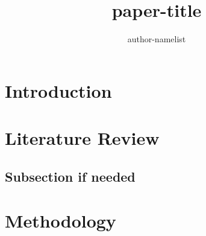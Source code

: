 \documentclass{article}
\title{paper-title}
\author{author-namelist}
\begin{document}
\maketitle

\begin{abstract}


\end{abstract}

\section{Introduction}


\section{Literature Review}


\subsection{Subsection if needed}

\section{Methodology}
\end{document}
